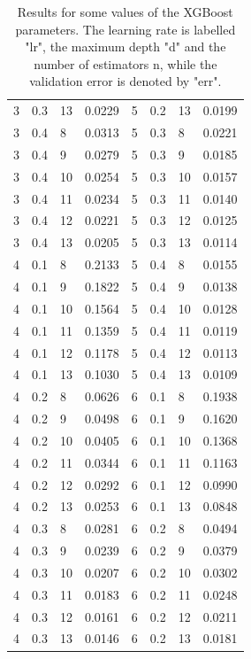 \begin{table}[h!]
\begin{tabular}{|l|l|l|l||l|l|l|l|}
        3 & 0.3 &  13 & 0.0229 & 5 & 0.2 &  13 & 0.0199 \\
        3 & 0.4 &  8  & 0.0313 & 5 & 0.3 &  8  & 0.0221 \\
        3 & 0.4 &  9  & 0.0279 & 5 & 0.3 &  9  & 0.0185 \\
        3 & 0.4 &  10 & 0.0254 & 5 & 0.3 &  10 & 0.0157 \\
        3 & 0.4 &  11 & 0.0234 & 5 & 0.3 &  11 & 0.0140 \\
        3 & 0.4 &  12 & 0.0221 & 5 & 0.3 &  12 & 0.0125 \\
        3 & 0.4 &  13 & 0.0205 & 5 & 0.3 &  13 & 0.0114 \\
        4 & 0.1 &  8  & 0.2133 & 5 & 0.4 &  8  & 0.0155 \\
        4 & 0.1 &  9  & 0.1822 & 5 & 0.4 &  9  & 0.0138 \\
        4 & 0.1 &  10 & 0.1564 & 5 & 0.4 &  10 & 0.0128 \\
        4 & 0.1 &  11 & 0.1359 & 5 & 0.4 &  11 & 0.0119 \\
        4 & 0.1 &  12 & 0.1178 & 5 & 0.4 &  12 & 0.0113 \\
        4 & 0.1 &  13 & 0.1030 & 5 & 0.4 &  13 & 0.0109 \\
        4 & 0.2 &  8  & 0.0626 & 6 & 0.1 &  8  & 0.1938 \\
        4 & 0.2 &  9  & 0.0498 & 6 & 0.1 &  9  & 0.1620 \\
        4 & 0.2 &  10 & 0.0405 & 6 & 0.1 &  10 & 0.1368 \\
        4 & 0.2 &  11 & 0.0344 & 6 & 0.1 &  11 & 0.1163 \\
        4 & 0.2 &  12 & 0.0292 & 6 & 0.1 &  12 & 0.0990 \\
        4 & 0.2 &  13 & 0.0253 & 6 & 0.1 &  13 & 0.0848 \\
        4 & 0.3 &  8  & 0.0281 & 6 & 0.2 &  8  & 0.0494 \\
        4 & 0.3 &  9  & 0.0239 & 6 & 0.2 &  9  & 0.0379 \\
        4 & 0.3 &  10 & 0.0207 & 6 & 0.2 &  10 & 0.0302 \\
        4 & 0.3 &  11 & 0.0183 & 6 & 0.2 &  11 & 0.0248 \\
        4 & 0.3 &  12 & 0.0161 & 6 & 0.2 &  12 & 0.0211 \\
        4 & 0.3 &  13 & 0.0146 & 6 & 0.2 &  13 & 0.0181 \\ \hline
    \end{tabular}
    \caption{Results for some values of the XGBoost parameters. The learning rate is labelled "lr", the maximum depth "d" and the number of estimators n, while the validation error is denoted by "err".}
    \label{tab:results-xgboost}
\end{table}


